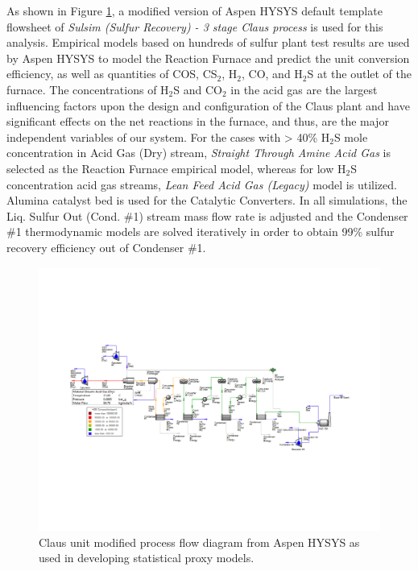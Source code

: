 \documentclass[11pt]{report}
\begin{document}
As shown in Figure \ref{fig:Clausaspen}, a modified version of Aspen HYSYS default template flowsheet of \emph{Sulsim (Sulfur Recovery) - 3 stage Claus process} is used for this analysis. Empirical models based on hundreds of sulfur plant test results are used by Aspen HYSYS to model the Reaction Furnace and predict the unit conversion efficiency, as well as quantities of COS, CS$_2$, H$_2$, CO, and H$_2$S at the outlet of the furnace. The concentrations of H$_2$S and CO$_2$ in the acid gas are the largest influencing factors upon the design and configuration of the Claus plant and have significant effects on the net reactions in the furnace, and thus, are the major independent variables of our system. For the cases with > 40\% H$_2$S mole concentration in Acid Gas (Dry) stream, \emph{Straight Through Amine Acid Gas} is selected as the Reaction Furnace empirical model, whereas for low H$_2$S concentration acid gas streams, \emph{Lean Feed Acid Gas (Legacy)} model is utilized. Alumina catalyst bed is used for the Catalytic Converters. In all simulations, the Liq. Sulfur Out (Cond. \#1) stream mass flow rate is adjusted and the Condenser \#1 thermodynamic models are solved iteratively in order to obtain 99\% sulfur recovery efficiency out of Condenser \#1. 

\begin{figure}
\includegraphics[width=1\columnwidth]{images/Clausaspen.pdf}
\caption{Claus unit modified process flow diagram from Aspen HYSYS as used in developing statistical proxy models.}
\label{fig:Clausaspen}
\end{figure}
\end{document}
